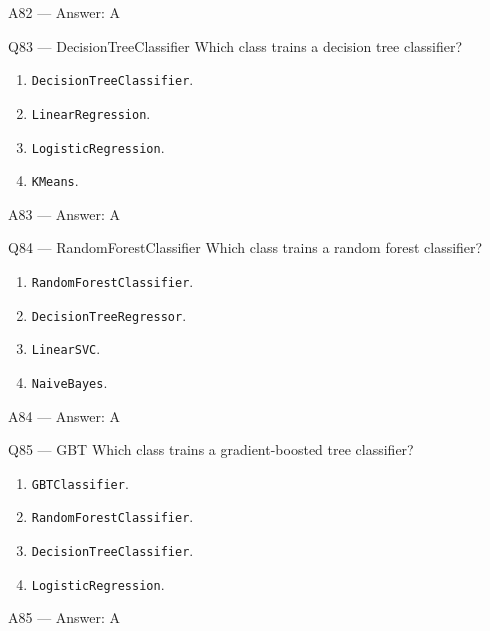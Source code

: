 \documentclass[aspectratio=169,10pt]{beamer}
\begin{document}
	\begin{frame}{A82 — Answer: A}
	\end{frame}
	
	\begin{frame}{Q83 — DecisionTreeClassifier}
		Which class trains a decision tree classifier?
		\begin{enumerate}[label=\Alph*.]
			\item \texttt{DecisionTreeClassifier}.
			\item \texttt{LinearRegression}.
			\item \texttt{LogisticRegression}.
			\item \texttt{KMeans}.
		\end{enumerate}
	\end{frame}
	
	\begin{frame}{A83 — Answer: A}
	\end{frame}
	
	\begin{frame}{Q84 — RandomForestClassifier}
		Which class trains a random forest classifier?
		\begin{enumerate}[label=\Alph*.]
			\item \texttt{RandomForestClassifier}.
			\item \texttt{DecisionTreeRegressor}.
			\item \texttt{LinearSVC}.
			\item \texttt{NaiveBayes}.
		\end{enumerate}
	\end{frame}
	
	\begin{frame}{A84 — Answer: A}
	\end{frame}
	
	\begin{frame}{Q85 — GBT}
		Which class trains a gradient-boosted tree classifier?
		\begin{enumerate}[label=\Alph*.]
			\item \texttt{GBTClassifier}.
			\item \texttt{RandomForestClassifier}.
			\item \texttt{DecisionTreeClassifier}.
			\item \texttt{LogisticRegression}.
		\end{enumerate}
	\end{frame}
	
	\begin{frame}{A85 — Answer: A}
	\end{frame}
	
\end{document}
